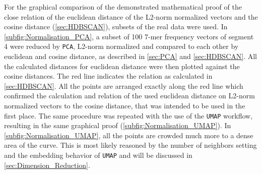 For the graphical comparison of the demonstrated mathematical proof of the close relation of the euclidean distance of the L2-norm normalized vectors and the cosine distance (\autoref{sec:HDBSCAN}), subsets of the real data were used. In \autoref{subfig:Normalisation_PCA}, a subset of 100 7-mer frequency vectors of segment 4 were reduced by \texttt{PCA}, L2-norm normalized and compared to each other by euclidean and cosine distance, as described in \autoref{sec:PCA} and \autoref{sec:HDBSCAN}. All the calculated distances for euclidean distance were then plotted against the cosine distances. The red line indicates the relation as calculated in \autoref{sec:HDBSCAN}. All the points are arranged exactly along the red line which confirmed the calculation and relation of the used euclidean distance on L2-norm normalized vectors to the cosine distance, that was intended to be used in the first place. The same procedure was repeated with the use of the \texttt{UMAP} workflow, resulting in the same graphical proof (\autoref{subfig:Normalisation_UMAP}). In \autoref{subfig:Normalisation_UMAP}, all the points are crowded much more to a dense area of the curve. This is most likely reasoned by the number of neighbors setting and the embedding behavior of \texttt{UMAP} and will be discussed in \autoref{sec:Dimension_Reduction}.











